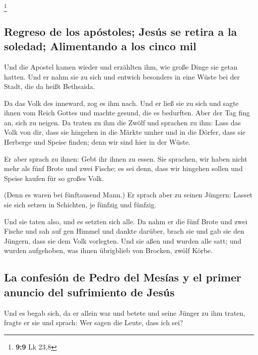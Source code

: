 \footnote{\textbf{9:9} Lk 23,8}

\hypertarget{regreso-de-los-apuxf3stoles-jesuxfas-se-retira-a-la-soledad-alimentando-a-los-cinco-mil}{%
\subsection{Regreso de los apóstoles; Jesús se retira a la soledad;
Alimentando a los cinco
mil}\label{regreso-de-los-apuxf3stoles-jesuxfas-se-retira-a-la-soledad-alimentando-a-los-cinco-mil}}

 Und die Apostel kamen wieder und erzählten ihm, wie
große Dinge sie getan hatten. Und er nahm sie zu sich und entwich
besonders in eine Wüste bei der Stadt, die da heißt Bethsaida.

 Da das Volk des inneward, zog es ihm nach. Und er ließ
sie zu sich und sagte ihnen vom Reich Gottes und machte gesund, die es
bedurften. Aber der Tag fing an, sich zu neigen.  Da
traten zu ihm die Zwölf und sprachen zu ihm: Lass das Volk von dir, dass
sie hingehen in die Märkte umher und in die Dörfer, dass sie Herberge
und Speise finden; denn wir sind hier in der Wüste.

 Er aber sprach zu ihnen: Gebt ihr ihnen zu essen. Sie
sprachen, wir haben nicht mehr als fünf Brote und zwei Fische; es sei
denn, dass wir hingehen sollen und Speise kaufen für so großes Volk.

 (Denn es waren bei fünftausend Mann.) Er sprach aber zu
seinen Jüngern: Lasset sie sich setzen in Schichten, je fünfzig und
fünfzig.

 Und sie taten also, und es setzten sich alle.
 Da nahm er die fünf Brote und zwei Fische und sah auf
gen Himmel und dankte darüber, brach sie und gab sie den Jüngern, dass
sie dem Volk vorlegten.  Und sie aßen und wurden alle
satt; und wurden aufgehoben, was ihnen übrigblieb von Brocken, zwölf
Körbe.

\hypertarget{la-confesiuxf3n-de-pedro-del-mesuxedas-y-el-primer-anuncio-del-sufrimiento-de-jesuxfas}{%
\subsection{La confesión de Pedro del Mesías y el primer anuncio del
sufrimiento de
Jesús}\label{la-confesiuxf3n-de-pedro-del-mesuxedas-y-el-primer-anuncio-del-sufrimiento-de-jesuxfas}}

 Und es begab sich, da er allein war und betete und seine
Jünger zu ihm traten, fragte er sie und sprach: Wer sagen die Leute,
dass ich sei?

